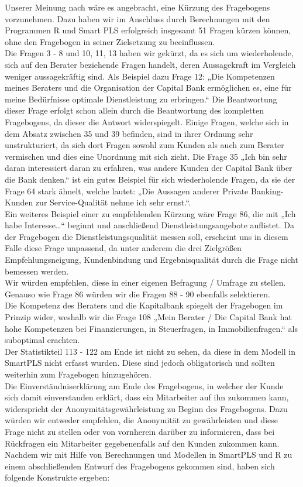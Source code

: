 \documentclass{article}\usepackage[]{graphicx}\usepackage[]{color}
\begin{document}

\label{fragebogen}


Unserer Meinung nach wäre es angebracht, eine Kürzung des Fragebogens vorzunehmen. Dazu haben wir im Anschluss durch Berechnungen mit den Programmen R und Smart PLS erfolgreich insgesamt 51 Fragen kürzen können, ohne den Fragebogen in seiner Zielsetzung zu beeinflussen.\\
Die Fragen 3 - 8 und 10, 11, 13 haben wir gekürzt, da es sich um wiederholende, sich auf den Berater beziehende Fragen handelt, deren Aussagekraft im Vergleich weniger aussagekräftig sind. Als Beispiel dazu Frage 12: „Die Kompetenzen meines Beraters und die Organisation der Capital Bank ermöglichen es, eine für meine Bedürfnisse optimale Dienstleistung zu erbringen.“ Die Beantwortung dieser Frage erfolgt schon allein durch die Beantwortung des kompletten Fragebogens, da dieser die Antwort widerspiegelt. Einige Fragen, welche sich in dem Absatz zwischen 35 und 39 befinden, sind in ihrer Ordnung sehr unstrukturiert, da sich dort Fragen sowohl zum Kunden als auch zum Berater vermischen und dies eine Unordnung mit sich zieht. Die Frage 35 „Ich bin sehr daran interessiert daran zu erfahren, was andere Kunden der Capital Bank über die Bank denken.“ ist ein gutes Beispiel für sich wiederholende Fragen, da sie der Frage 64 stark ähnelt, welche lautet: „Die Aussagen anderer Private Banking-Kunden zur Service-Qualität nehme ich sehr ernst.“.\\
Ein weiteres Beispiel einer zu empfehlenden Kürzung wäre Frage 86, die mit „Ich habe Interesse…“ beginnt und anschließend Dienstleistungsangebote auflistet. Da der Fragebogen die Dienstleistungsqualität messen soll, erscheint uns in diesem Falle diese Frage unpassend, da unter anderem die drei Zielgrößen Empfehlungsneigung, Kundenbindung und Ergebnisqualität durch die Frage nicht bemessen werden.\\
Wir würden empfehlen, diese in einer eigenen Befragung / Umfrage zu stellen. Genauso wie Frage 86 würden wir die Fragen 88 - 90 ebenfalls selektieren.\\
Die Kompetenz des Beraters und die Kapitalbank spiegelt der Fragebogen im Prinzip wider, weshalb wir die Frage 108 „Mein Berater / Die Capital Bank hat hohe Kompetenzen bei Finanzierungen, in Steuerfragen, in Immobilienfragen.“ als suboptimal erachten.\\
Der Statistikteil 113 - 122 am Ende ist nicht zu sehen, da diese in dem Modell in SmartPLS nicht erfasst wurden. Diese sind jedoch obligatorisch und sollten weiterhin zum Fragebogen hinzugehören.\\
Die Einverständniserklärung am Ende des Fragebogens, in welcher der Kunde sich damit einverstanden erklärt, dass ein Mitarbeiter auf ihn zukommen kann, widerspricht der Anonymitätsgewährleistung zu Beginn des Fragebogens. Dazu würden wir entweder empfehlen, die Anonymität zu gewährleisten und diese Frage nicht zu stellen oder von vornherein darüber zu informieren, dass bei Rückfragen ein Mitarbeiter gegebenenfalls auf den Kunden zukommen kann.\\
Nachdem wir mit Hilfe von Berechnungen und Modellen in SmartPLS und R zu einem abschließenden Entwurf des Fragebogens gekommen sind, haben sich folgende Konstrukte ergeben:
\end{document}
